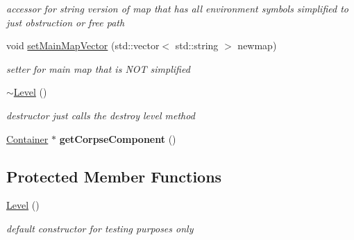 \begin{DoxyCompactItemize}
\begin{DoxyCompactList}\small\item\em accessor for string version of map that has all environment symbols simplified to just obstruction or free path \end{DoxyCompactList}\item 
\hypertarget{class_level_a5087842ccd1a2b5f1e4dc0bab6d6823c}{}\label{class_level_a5087842ccd1a2b5f1e4dc0bab6d6823c} 
void \hyperlink{class_level_a5087842ccd1a2b5f1e4dc0bab6d6823c}{set\+Main\+Map\+Vector} (std\+::vector$<$ std\+::string $>$ newmap)
\begin{DoxyCompactList}\small\item\em setter for main map that is N\+OT simplified \end{DoxyCompactList}\item 
\hypertarget{class_level_a249eac1e8f19ff44134efa5e986feaca}{}\label{class_level_a249eac1e8f19ff44134efa5e986feaca} 
\hyperlink{class_level_a249eac1e8f19ff44134efa5e986feaca}{$\sim$\+Level} ()
\begin{DoxyCompactList}\small\item\em destructor just calls the destroy level method \end{DoxyCompactList}\item 
\hypertarget{class_level_a6b26f3fb3db168f5f0037fa38c5d73b4}{}\label{class_level_a6b26f3fb3db168f5f0037fa38c5d73b4} 
\hyperlink{class_container}{Container} $\ast$ {\bfseries get\+Corpse\+Component} ()
\end{DoxyCompactItemize}
\subsection*{Protected Member Functions}
\begin{DoxyCompactItemize}
\item 
\hypertarget{class_level_a7a696c928ca5d5354db6e50e46d0f67d}{}\label{class_level_a7a696c928ca5d5354db6e50e46d0f67d} 
\hyperlink{class_level_a7a696c928ca5d5354db6e50e46d0f67d}{Level} ()
\begin{DoxyCompactList}\small\item\em default constructor for testing purposes only \end{DoxyCompactList}\end{DoxyCompactItemize}

